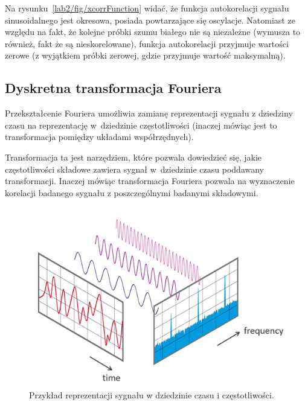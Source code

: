 Na rysunku~\ref{lab2/fig/xcorrFunction} widać, że funkcja autokorelacji sygnału sinusoidalnego jest okresowa, posiada powtarzające się oscylacje. Natomiast ze względu na fakt, że kolejne próbki szumu białego nie są niezależne (wymusza to również, fakt że są nieskorelowane), funkcja autokorelacji przyjmuje wartości zerowe (z wyjątkiem próbki zerowej, gdzie przyjmuje wartość maksymalną). 

\subsection{Dyskretna transformacja Fouriera}
Przekształcenie Fouriera umożliwia zamianę reprezentacji sygnału z dziedziny czasu na reprezentację w~dziedzinie częstotliwości (inaczej mówiąc jest to transformacja pomiędzy układami współrzędnych). 

Transformacja ta jest narzędziem, które pozwala dowiedzieć się, jakie częstotliwości składowe zawiera sygnał w~dziedzinie czasu poddawany transformacji. Inaczej mówiąc transformacja Fouriera pozwala na wyznaczenie korelacji badanego sygnału z poszczególnymi badanymi składowymi.

\begin{figure}[hbt!]
	\centering
	\includegraphics[width=0.9\linewidth]{images/fourierTransform.png}
	\caption{Przykład reprezentacji sygnału w dziedzinie czasu i częstotliwości.}
	\label{lab2/fig/fourierTransform}
\end{figure}

